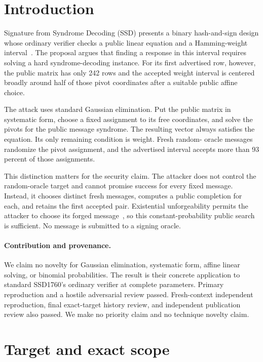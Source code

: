 \documentclass[10pt,a4paper]{article}
\begin{document}
\section{Introduction}

Signature from Syndrome Decoding (SSD) presents a binary hash-and-sign design
whose ordinary verifier checks a public linear equation and a Hamming-weight
interval~\cite{ssd}. The proposal argues that finding a response in this
interval requires solving a hard syndrome-decoding instance. For its first
advertised row, however, the public matrix has only 242 rows and the accepted
weight interval is centered broadly around half of those pivot coordinates
after a suitable public affine choice.

The attack uses standard Gaussian elimination. Put the public matrix in
systematic form, choose a fixed assignment to its free coordinates, and solve
the pivots for the public message syndrome. The resulting vector always
satisfies the equation. Its only remaining condition is weight. Fresh random-
oracle messages randomize the pivot assignment, and the advertised interval
accepts more than 93 percent of those assignments.

This distinction matters for the security claim. The attacker does not
control the random-oracle target and cannot promise success for every fixed
message. Instead, it chooses distinct fresh messages, computes a public
completion for each, and retains the first accepted pair. Existential
unforgeability permits the attacker to choose its forged message~\cite{gmr}, so this
constant-probability public search is sufficient. No message is submitted to
a signing oracle.

\paragraph{Contribution and provenance.}
We claim no novelty for Gaussian elimination, systematic form, affine linear
solving, or binomial probabilities. The result is their concrete application
to standard SSD1760's ordinary verifier at complete parameters. Primary
reproduction and a hostile adversarial review passed. Fresh-context
independent reproduction, final exact-target history review, and independent
publication review also passed. We make no priority claim and no technique
novelty claim.

\section{Target and exact scope}
\end{document}
